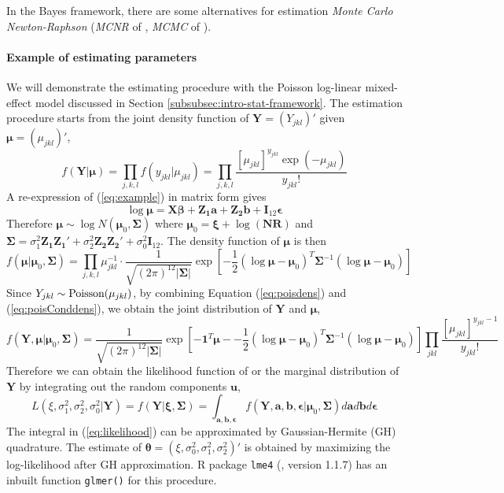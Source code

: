 		In the Bayes framework, there are some alternatives for estimation \textit{Monte Carlo Newton-Raphson} (\textit{MCNR} of \citealt{mcculloch1997maximum}, \textit{MCMC} of \citealt{hadfield2010mcmc}).

	\paragraph{Example of estimating parameters}
	We will demonstrate the estimating procedure with the Poisson log-linear mixed-effect model discussed in Section \ref{subsubsec:intro-stat-framework}.
	The estimation procedure starts from the joint density function of $\bm Y=(Y_{jkl})'$ given $\bm \mu= (\mu_{jkl})'$,
	\begin{equation}\label{eq:poisdens}
	f(\bm Y|\bm \mu )=\prod_{ j, k,l}f(y_{jkl}|\mu_{jkl})=\prod_{j,k,l}\frac{[\mu_{jkl}]^{y_{jkl}}\exp(-\mu_{jkl})}{y_{jkl}!}
	\end{equation}
	A re-expression of  (\ref{eq:example}) in matrix form gives 
	\[\log\bm \mu= \bm {X\beta} + \bm {Z_1 a} + \bm{Z_2b} + \bm I_{12}\bm \epsilon \]
	Therefore  $\bm\mu  \sim \log N(\bm \mu_0, \bm \Sigma)$ where $\bm \mu_0 =\bm\xi + \log(\bm {NR})$ and $\bm \Sigma = \sigma_1^2\bm {Z_1Z_1'} + \sigma_2^2\bm {Z_2 Z_2'} +\sigma_0^2 \bm I_{12}$.
	The density function of $\bm \mu$ is then
	\begin{equation}\label{eq:poisConddens}
	f(\bm \mu |\bm \mu_0, \bm \Sigma)=\prod_{j,k,l} \mu_{jkl}^{-1}\cdot \frac{1}{ \sqrt{(2\pi)^{12}|\bm\Sigma|}}\exp[-\frac{1}{2} {(\log\bm \mu - \bm \mu_0)^T\bm \Sigma^{-1}(\log\bm \mu - \bm \mu_0)}]
	\end{equation}
	Since $Y_{jkl}\sim \text{Poisson} (\mu_{jkl})$, by combining Equation (\ref{eq:poisdens}) and (\ref{eq:poisConddens}), we obtain the joint distribution of $\bm Y$ and $\bm \mu$,
	\[f(\bm Y, \bm \mu |\bm \mu_0, \bm \Sigma) =\frac{1}{\sqrt{(2\pi)^{12}|\bm \Sigma|}}\exp[-\bm 1^T\bm \mu - -\frac{1}{2} {(\log\bm \mu - \bm \mu_0)^T\bm \Sigma^{-1}(\log\bm \mu - \bm \mu_0)}]\prod_{jkl}\frac{[\mu_{jkl}]^{y_{jkl}-1}}{y_{jkl}!}\]
	Therefore we can obtain the likelihood function of or the marginal distribution of $\bm Y$ by integrating out the random components $\bm u$,
	\begin{equation}\label{eq:likelihood}
	L(\xi, \sigma_1^2, \sigma_2^2, \sigma_0^2|\bm Y)=f(\bm Y|\bm \xi, \bm \Sigma)= \int_{\bm{a,b,\epsilon}} f(\bm Y, \bm a, \bm b, \bm \epsilon |\bm \mu_0, \bm \Sigma)d\bm a d \bm b d\bm \epsilon 
	\end{equation}
	The integral in (\ref{eq:likelihood}) can be approximated by Gaussian-Hermite (GH) quadrature. The estimate of $\bm\theta = (\xi, \sigma_0^2, \sigma_1^2, \sigma_2^2)'$ is obtained by maximizing the log-likelihood after GH approximation. R package \verb"lme4" (\cite{bates2012lme4}, version 1.1.7) has an inbuilt function \verb"glmer()" for this procedure.


